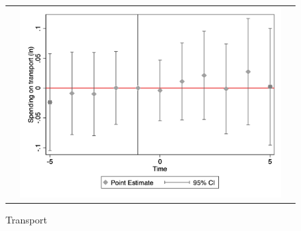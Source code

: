 \begin{figure}[!ht]
\begin{tabular}{@{}ccc@{}}
\begin{minipage}[t]{0.32\textwidth}
            \label{fig:sport}
        \end{minipage} &
        \begin{minipage}[t]{0.32\textwidth}
            \centering
            \caption{Transport}
            \includegraphics[width=\linewidth]{images/total population/eventdd_ln_q4_08_step1.jpg}
            \label{fig:transport}
        \end{minipage} \\[10pt]


\end{tabular}
\end{figure}
